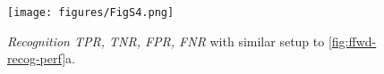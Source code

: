 \begin{figure}[H]
    \centering
    \texttt{[image: figures/FigS4.png]}
    \caption{
    \textit{Recognition TPR, TNR, FPR, FNR}
    with similar setup to \autoref{fig:ffwd-recog-perf}a.
    }
    \label{supp:ffwd-recog-more}
\end{figure}